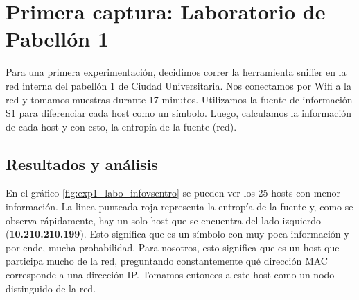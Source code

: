 \section{Primera captura: Laboratorio de Pabellón 1}

\par Para una primera experimentación, decidimos correr la herramienta sniffer en la red interna del pabellón 1 de Ciudad Universitaria. Nos conectamos por Wifi a la red y tomamos muestras durante 17 minutos. Utilizamos la fuente de información S1 para diferenciar cada host como un símbolo. Luego, calculamos la información de cada host y con esto, la entropía de la fuente (red).

\subsection{Resultados y análisis}

\par En el gráfico \ref{fig:exp1_labo_infovsentro} se pueden ver los 25 hosts con menor información. La linea punteada roja representa la entropía de la fuente y, como se observa rápidamente, hay un solo host que se encuentra del lado izquierdo (\textbf{10.210.210.199}). Esto significa que es un símbolo con muy poca información y por ende, mucha probabilidad. Para nosotros, esto significa que es un host que participa mucho de la red, preguntando constantemente qué dirección MAC corresponde a una dirección IP. Tomamos entonces a este host como un nodo distinguido de la red.


